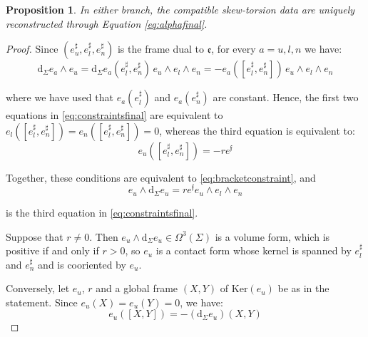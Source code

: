 \documentclass[10pt,reqno,a4paper]{amsart}
\theoremstyle{plain}
\newtheorem{prop}[thm]{Proposition}
\theoremstyle{definition}
\theoremstyle{remark}
\theoremstyle{remark}
\def\dd{\mathrm{d}}
\def\fre{\mathfrak{e}}
\renewcommand{\(}{ (}
\renewcommand{\)}{ )}
\newcommand{\frf}{\mathfrak{f}}
\begin{document}
\begin{prop}
\noindent
In either branch, the compatible skew-torsion data are uniquely reconstructed through Equation \eqref{eq:alphafinal}.
\end{prop}

\begin{proof}
Since $(e^{\sharp}_{u},e^{\sharp}_{l},e^{\sharp}_{n})$ is the frame dual to $\fre$, for every $a = u,l,n$ we have:
\begin{equation*}
\dd_{\Sigma} e_a \wedge e_u = \dd_{\Sigma} e_a (e^{\sharp}_{l},e^{\sharp}_{n})\, e_u\wedge e_l\wedge e_n = - e_a ([e^{\sharp}_{l},e^{\sharp}_{n}])\, e_u\wedge e_l\wedge e_n
\end{equation*}

\noindent
where we have used that $e_a(e^{\sharp}_{l})$ and $e_a(e^{\sharp}_{n})$ are constant. Hence, the first two equations in \eqref{eq:constraintsfinal} are equivalent to $e_l([e^{\sharp}_{l},e^{\sharp}_{n}]) = e_n([e^{\sharp}_{l},e^{\sharp}_{n}]) = 0$, whereas the third equation is equivalent to:
\begin{equation*}
e_u([e^{\sharp}_{l},e^{\sharp}_{n}]) = - r e^{\frf}    
\end{equation*}

\noindent
Together, these conditions are equivalent to \eqref{eq:bracketconstraint}, and
\begin{equation*}
 e_u\wedge \dd_{\Sigma} e_u = r e^{\frf} e_u\wedge e_l\wedge e_n   
\end{equation*}

\noindent
is the third equation in \eqref{eq:constraintsfinal}.  \medskip

\noindent
Suppose that $r\neq 0$. Then $e_u\wedge \dd_{\Sigma} e_u \in \Omega^3(\Sigma)$ is a volume form, which is positive if and only if $r>0$, so $e_u$ is a contact form whose kernel is spanned by $e^{\sharp}_{l}$ and $e^{\sharp}_{n}$ and is cooriented by $e_u$. \medskip

Conversely, let $e_u$, $r$ and a global frame $(X, Y)$ of $\mathrm{Ker}(e_u)$ be as in the statement. Since $e_u(X) = e_u(Y) = 0$, we have:
\begin{equation*}
e_u([X, Y]) = - (\dd _\Sigma e_u) (X, Y)    
\end{equation*}


\end{proof}
\end{document}
